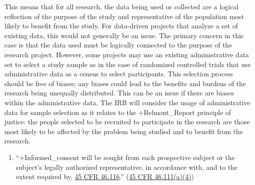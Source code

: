 \documentclass[
]{book}
\providecommand{\tightlist}{%
  \setlength{\itemsep}{0pt}\setlength{\parskip}{0pt}}
\begin{document}
This means that for all research, the data being used or collected are a logical reflection of the purpose of the study and representative of the population most likely to benefit from the study. For data-driven projects that analyze a set of existing data, this would not generally be an issue. The primary concern in this case is that the data used must be logically connected to the purpose of the research project. However, some projects may use an existing administrative data set to select a study sample as in the case of randomized controlled trials that use administrative data as a census to select participants. This selection process should be free of biases; any biases could lead to the benefits and burdens of the research being unequally distributed. This can be an issue if there are biases within the administrative data. The IRB will consider the usage of administrative data for sample selection as it relates to the +Belmont\_Report\textbar{} principle of justice: the people selected to be recruited to participate in the research are those most likely to be affected by the problem being studied and to benefit from the research.

\begin{enumerate}
\def\labelenumi{(\arabic{enumi})}
\setcounter{enumi}{3}
\tightlist
\item
  ``+Informed\_consent\textbar{} will be sought from each prospective subject or the subject's legally authorized representative, in accordance with, and to the extent required by, \href{https://www.law.cornell.edu/cfr/text/45/46.116}{45 CFR 46.116}.'' (\href{https://www.law.cornell.edu/cfr/text/45/46.111}{45 CFR 46.111(a)(4)})
\end{enumerate}
\end{document}

